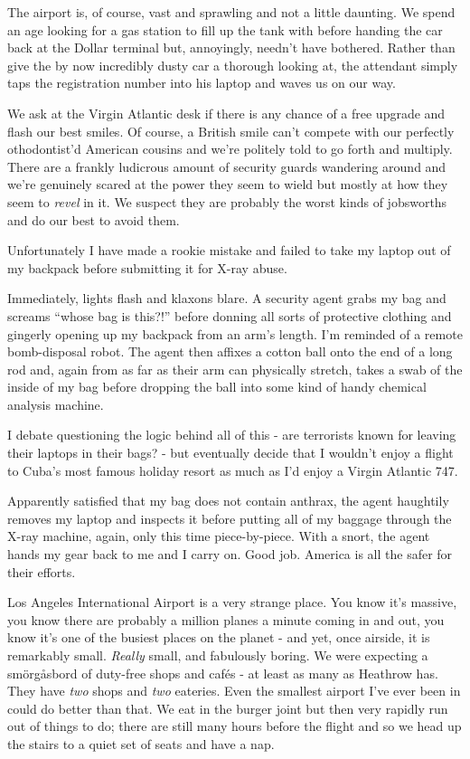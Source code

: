 \documentclass[a5paper,titlepage,11pt]{book}
\begin{document}
The airport is, of course, vast and sprawling and not a little daunting. We spend an age looking for a gas station to fill up the tank with before handing the car back at the Dollar terminal but, annoyingly, needn't have bothered. Rather than give the by now incredibly dusty car a thorough looking at, the attendant simply taps the registration number into his laptop and waves us on our way.

We ask at the Virgin Atlantic desk if there is any chance of a free upgrade and flash our best smiles. Of course, a British smile can't compete with our perfectly othodontist'd American cousins and we're politely told to go forth and multiply. There are a frankly ludicrous amount of security guards wandering around and we're genuinely scared at the power they seem to wield but mostly at how they seem to \emph{revel} in it. We suspect they are probably the worst kinds of jobsworths and do our best to avoid them.

Unfortunately I have made a rookie mistake and failed to take my laptop out of my backpack before submitting it for X-ray abuse.

Immediately, lights flash and klaxons blare. A security agent grabs my bag and screams ``whose bag is this?!'' before donning all sorts of protective clothing and gingerly opening up my backpack from an arm's length. I'm reminded of a remote bomb-disposal robot. The agent then affixes a cotton ball onto the end of a long rod and, again from as far as their arm can physically stretch, takes a swab of the inside of my bag before dropping the ball into some kind of handy chemical analysis machine.

I debate questioning the logic behind all of this - are terrorists known for leaving their laptops in their bags? - but eventually decide that I wouldn't enjoy a flight to Cuba's most famous holiday resort as much as I'd enjoy a Virgin Atlantic 747.

Apparently satisfied that my bag does not contain anthrax, the agent haughtily removes my laptop and inspects it before putting all of my baggage through the X-ray machine, again, only this time piece-by-piece. With a snort, the agent hands my gear back to me and I carry on. Good job. America is all the safer for their efforts.

Los Angeles International Airport is a very strange place. You know it's massive, you know there are probably a million planes a minute coming in and out, you know it's one of the busiest places on the planet - and yet, once airside, it is remarkably small. \emph{Really} small, and fabulously boring. We were expecting a sm\"{o}rg\r{a}sbord of duty-free shops and caf\'{e}s - at least as many as Heathrow has. They have \emph{two} shops and \emph{two} eateries. Even the smallest airport I've ever been in could do better than that. We eat in the burger joint but then very rapidly run out of things to do; there are still many hours before the flight and so we head up the stairs to a quiet set of seats and have a nap.
\end{document}
